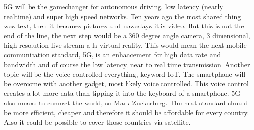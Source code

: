 5G will be the gamechanger for autonomous driving. low latency (nearly realtime) and super high speed networks. Ten years ago the most shared thing was text, then it becomes pictures and nowadays it is video. But this is not the end of the line, the next step would be a 360 degree angle camera, 3 dimensional, high resolution live stream a la virtual reality. This would mean the next mobile communication standard, 5G, is an enhancement for high data rate and bandwidth and of course the low latency, near to real time transmission. Another topic will be the voice controlled everything, keyword IoT. The smartphone will be overcome with another gadget, most likely voice controlled. This voice control creates a lot more data than tipping it into the keyboard of a smartphone. 5G also means to connect the world, so Mark Zuckerberg. The next standard should be more efficient, cheaper and therefore it should be affordable for every country. Also it could be possible to cover those countries via satellite.

